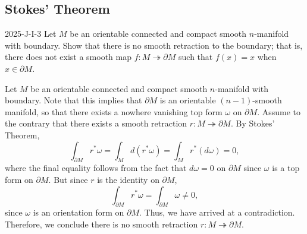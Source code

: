 \documentclass{article}
\begin{document}
	\newpage 
	\subsection{Stokes' Theorem}
	\begin{prb}{2025-J-I-3}
		Let $M$ be an orientable connected and compact smooth $n$-manifold with boundary. Show that there is no smooth retraction to the boundary; that is, there does not exist a smooth map $f: M \twoheadrightarrow \partial M$ such that $f(x) = x$ when $x \in \partial M$. 
	\end{prb}
	Let $M$ be an orientable connected and compact smooth $n$-manifold with boundary. Note that this implies that $\partial M$ is an orientable $(n-1)$-smooth manifold, so that there exists a nowhere vanishing top form $\omega$ on $\partial M$. Assume to the contrary that there exists a smooth retraction $r: M \twoheadrightarrow \partial M$. By Stokes' Theorem, 
	\begin{equation*}
		\int_{\partial M}r^{\ast}\omega = \int_{M}d(r^{\ast}\omega) = \int_{M}r^{\ast}(d\omega) = 0, 
	\end{equation*}
	where the final equality follows from the fact that $d\omega = 0$ on $\partial M$ since $\omega$ is a top form on $\partial M$. But since $r$ is the identity on $\partial M$, 
	\begin{equation*}
		\int_{\partial M}r^{\ast}\omega = \int_{\partial M}\omega \neq 0, 
	\end{equation*}
	since $\omega$ is an orientation form on $\partial M$. Thus, we have arrived at a contradiction. Therefore, we conclude there is no smooth retraction $r: M \twoheadrightarrow \partial M$. 
	
\end{document}
